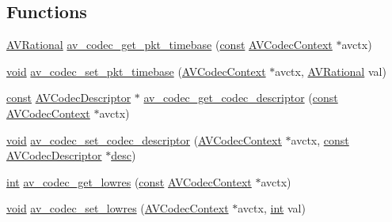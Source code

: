 \subsection*{Functions}
\begin{DoxyCompactItemize}
\item 
\hyperlink{struct_a_v_rational}{A\+V\+Rational} \hyperlink{group__lavc__core_ga99afa816f3fc9251ecf54ad305d43be3}{av\+\_\+codec\+\_\+get\+\_\+pkt\+\_\+timebase} (\hyperlink{getopt1_8c_a2c212835823e3c54a8ab6d95c652660e}{const} \hyperlink{struct_a_v_codec_context}{A\+V\+Codec\+Context} $\ast$avctx)
\item 
\hyperlink{sound_8c_ae35f5844602719cf66324f4de2a658b3}{void} \hyperlink{group__lavc__core_ga89c6c7cf5717165b8751aa84bf397557}{av\+\_\+codec\+\_\+set\+\_\+pkt\+\_\+timebase} (\hyperlink{struct_a_v_codec_context}{A\+V\+Codec\+Context} $\ast$avctx, \hyperlink{struct_a_v_rational}{A\+V\+Rational} val)
\item 
\hyperlink{getopt1_8c_a2c212835823e3c54a8ab6d95c652660e}{const} \hyperlink{struct_a_v_codec_descriptor}{A\+V\+Codec\+Descriptor} $\ast$ \hyperlink{group__lavc__core_gad7c67883918a8a68710b6f89f461c37f}{av\+\_\+codec\+\_\+get\+\_\+codec\+\_\+descriptor} (\hyperlink{getopt1_8c_a2c212835823e3c54a8ab6d95c652660e}{const} \hyperlink{struct_a_v_codec_context}{A\+V\+Codec\+Context} $\ast$avctx)
\item 
\hyperlink{sound_8c_ae35f5844602719cf66324f4de2a658b3}{void} \hyperlink{group__lavc__core_gad07ba397392e00cb2560cc9a39a60745}{av\+\_\+codec\+\_\+set\+\_\+codec\+\_\+descriptor} (\hyperlink{struct_a_v_codec_context}{A\+V\+Codec\+Context} $\ast$avctx, \hyperlink{getopt1_8c_a2c212835823e3c54a8ab6d95c652660e}{const} \hyperlink{struct_a_v_codec_descriptor}{A\+V\+Codec\+Descriptor} $\ast$\hyperlink{_export_p_c_m_8cpp_a717c8108dd6ce1ecc369d9bac2f471f2}{desc})
\item 
\hyperlink{xmltok_8h_a5a0d4a5641ce434f1d23533f2b2e6653}{int} \hyperlink{group__lavc__core_gae52334a4870627285d40a77be95dbe85}{av\+\_\+codec\+\_\+get\+\_\+lowres} (\hyperlink{getopt1_8c_a2c212835823e3c54a8ab6d95c652660e}{const} \hyperlink{struct_a_v_codec_context}{A\+V\+Codec\+Context} $\ast$avctx)
\item 
\hyperlink{sound_8c_ae35f5844602719cf66324f4de2a658b3}{void} \hyperlink{group__lavc__core_gaf4af025ede1f451152486b8f2805f544}{av\+\_\+codec\+\_\+set\+\_\+lowres} (\hyperlink{struct_a_v_codec_context}{A\+V\+Codec\+Context} $\ast$avctx, \hyperlink{xmltok_8h_a5a0d4a5641ce434f1d23533f2b2e6653}{int} val)
\item 

\end{DoxyCompactItemize}
